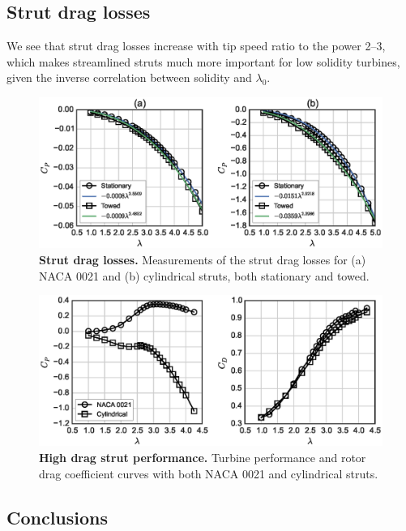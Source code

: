 \documentclass[10pt,letterpaper]{article}
\begin{document}
\subsection*{Strut drag losses}

We see that strut drag losses increase with tip speed ratio to the power 2--3,
which makes streamlined struts much more important for low solidity turbines,
given the inverse correlation between solidity and $\lambda_0$.


\begin{figure}[ht!]
\includegraphics[width=\textwidth]{figures/no_blades_all}
\caption{{\bf Strut drag losses.}
Measurements of the strut drag losses for (a) NACA 0021 and (b) cylindrical 
struts, both stationary and towed.}
\label{fig:no-blades}
\end{figure}


\begin{figure}[ht!]
\includegraphics[width=\textwidth]{figures/perf_covers}
\caption{{\bf High drag strut performance.}
Turbine performance and rotor drag coefficient curves with both NACA 0021
and cylindrical struts.}
\label{fig:perf-covers}
\end{figure}


\subsection*{Conclusions}
\end{document}
